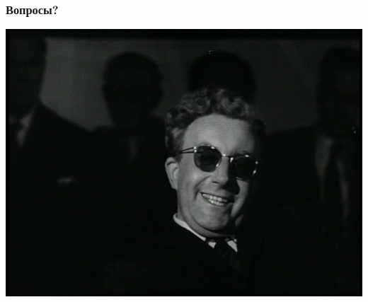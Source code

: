 \documentclass[10pt,utf8]{beamer}
\begin{document}
\begin{frame}[fragile]
  \frametitle{Вопросы?}

  \begin{center}
    \includegraphics[scale=0.25]{strangelove.png}
  \end{center}
\end{frame}
\end{document}
